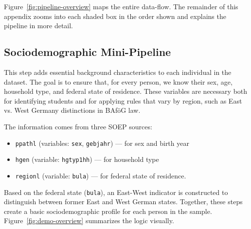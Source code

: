 Figure~\ref{fig:pipeline-overview} maps the entire data-flow.  
The remainder of this appendix zooms into each shaded box in the order shown
and explains the pipeline in more detail. 



\subsection{Sociodemographic Mini-Pipeline}

This step adds essential background characteristics to each individual in the dataset. The goal is to ensure that, for every person, we know their sex, age, household type, and federal state of residence. These variables are necessary both for identifying students and for applying rules that vary by region, such as East vs. West Germany distinctions in BAföG law.

The information comes from three SOEP sources:
\begin{itemize}
  \item \texttt{ppathl} (variables: \texttt{sex}, \texttt{gebjahr}) — for sex and birth year
  \item \texttt{hgen} (variable: \texttt{hgtyp1hh}) — for household type
  \item \texttt{regionl} (variable: \texttt{bula}) — for federal state of residence.
\end{itemize}

Based on the federal state (\texttt{bula}), an East-West indicator is constructed to distinguish between former East and West German states. Together, these steps create a basic sociodemographic profile for each person in the sample. Figure~\ref{fig:demo-overview} summarizes the logic visually.


